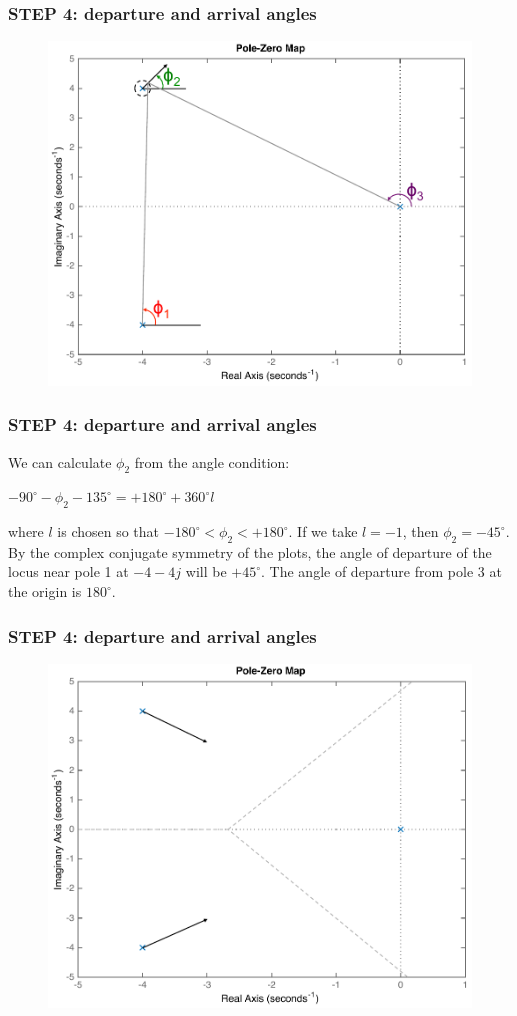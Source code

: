\begin{frame}
\frametitle{STEP 4: departure and arrival angles}
	\begin{figure}
		\centering
		\includegraphics[width=0.7\linewidth]{how_to_draw_ex4}
	\end{figure}
\end{frame}

\begin{frame}
\frametitle{STEP 4: departure and arrival angles}	
	\begin{exampleblock}{}
	We can calculate $\phi_2$ from the angle condition:
	\begin{center}
		$-90^{\circ} - \phi_2 - 135^{\circ} = +180^{\circ} + 360^{\circ}l$
	\end{center}
	where $l$ is chosen so that $-180^{\circ} < \phi_2 < +180^{\circ}$. If we take $l = -1$, then $\phi_2 = -45^{\circ}$.\\
	\vspace{1em}
	By the complex conjugate symmetry of the plots, the angle of departure of the locus near pole 1 at $-4 - 4j$ will be $+45^{\circ}$. The angle of departure from pole 3 at the origin is $180^{\circ}$.
	\end{exampleblock}
\end{frame}

\begin{frame}
\frametitle{STEP 4: departure and arrival angles}	
	\begin{exampleblock}{}
		\begin{figure}
			\centering
			\includegraphics[width=0.7\linewidth]{how_to_draw_ex5}
		\end{figure}
	\end{exampleblock}
\end{frame}

